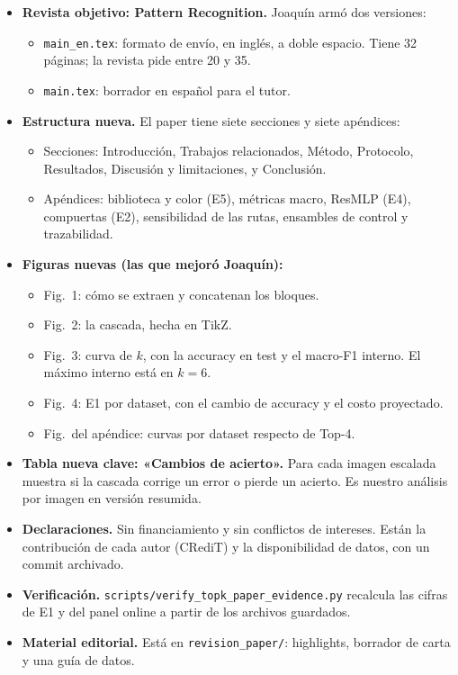 \documentclass[11pt,a4paper]{article}
\begin{document}
\begin{itemize}
\item \textbf{Revista objetivo: Pattern Recognition.} Joaquín armó dos versiones:
  \begin{itemize}
  \item \texttt{main\_en.tex}: formato de envío, en inglés, a doble espacio. Tiene 32 páginas; la revista pide entre 20 y 35.
  \item \texttt{main.tex}: borrador en español para el tutor.
  \end{itemize}
\item \textbf{Estructura nueva.} El paper tiene siete secciones y siete apéndices:
  \begin{itemize}
  \item Secciones: Introducción, Trabajos relacionados, Método, Protocolo, Resultados, Discusión y limitaciones, y Conclusión.
  \item Apéndices: biblioteca y color (E5), métricas macro, ResMLP (E4), compuertas (E2), sensibilidad de las rutas, ensambles de control y trazabilidad.
  \end{itemize}
\item \textbf{Figuras nuevas (las que mejoró Joaquín):}
  \begin{itemize}
  \item Fig.~1: cómo se extraen y concatenan los bloques.
  \item Fig.~2: la cascada, hecha en TikZ.
  \item Fig.~3: curva de $k$, con la accuracy en test y el macro-F1 interno. El máximo interno está en $k=6$.
  \item Fig.~4: E1 por dataset, con el cambio de accuracy y el costo proyectado.
  \item Fig.\ del apéndice: curvas por dataset respecto de Top-4.
  \end{itemize}
\item \textbf{Tabla nueva clave: «Cambios de acierto».} Para cada imagen escalada muestra si la cascada corrige un error o pierde un acierto. Es nuestro análisis por imagen en versión resumida.
\item \textbf{Declaraciones.} Sin financiamiento y sin conflictos de intereses. Están la contribución de cada autor (CRediT) y la disponibilidad de datos, con un commit archivado.
\item \textbf{Verificación.} \texttt{scripts/verify\_topk\_paper\_evidence.py} recalcula las cifras de E1 y del panel online a partir de los archivos guardados.
\item \textbf{Material editorial.} Está en \texttt{revision\_paper/}: highlights, borrador de carta y una guía de datos.
\end{itemize}
\end{document}
